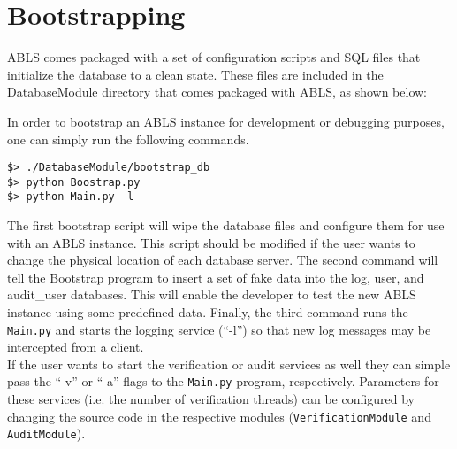 \section{Bootstrapping}

ABLS comes packaged with a set of configuration scripts and SQL files that initialize
the database to a clean state. These files are included in the DatabaseModule directory
that comes packaged with ABLS, as shown below:


In order to bootstrap an ABLS instance for development or debugging purposes, one can simply run the 
following commands.

\begin{lstlisting}
$> ./DatabaseModule/bootstrap_db
$> python Boostrap.py
$> python Main.py -l
\end{lstlisting}

The first bootstrap script will wipe the database files and configure them for use with an 
ABLS instance. This script should be modified if the user wants to change the physical
location of each database server. The second command will tell the Bootstrap program
to insert a set of fake data into the log, user, and audit\_user databases. This will enable
the developer to test the new ABLS instance using some predefined data. Finally, the third
command runs the {\tt Main.py} and starts the logging service (``-l'') so that new log messages
may be intercepted from a client. \\

If the user wants to start the verification or audit services as well they can simple pass the ``-v'' or
``-a'' flags to the {\tt Main.py} program, respectively. Parameters for these services (i.e. the number of 
verification threads) can be configured by changing the source code in the respective modules
({\tt VerificationModule} and {\tt AuditModule}).

